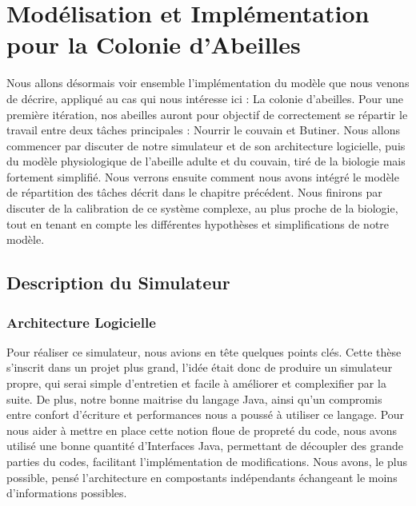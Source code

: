 \chapter{Modélisation et Implémentation pour la Colonie d'Abeilles}

	Nous allons désormais voir ensemble l'implémentation du modèle que nous venons de décrire, appliqué au cas qui nous intéresse ici : La colonie d'abeilles. Pour une première itération, nos abeilles auront pour objectif de correctement se répartir le travail entre deux tâches principales : Nourrir le couvain et Butiner. Nous allons commencer par discuter de notre simulateur et de son architecture logicielle, puis du modèle physiologique de l'abeille adulte et du couvain, tiré de la biologie mais fortement simplifié. Nous verrons ensuite comment nous avons intégré le modèle de répartition des tâches décrit dans le chapitre précédent. Nous finirons par discuter de la calibration de ce système complexe, au plus proche de la biologie, tout en tenant en compte les différentes hypothèses et simplifications de notre modèle.
	
	\section{Description du Simulateur}
		\subsection{Architecture Logicielle}
			Pour réaliser ce simulateur, nous avions en tête quelques points clés. Cette thèse s'inscrit dans un projet plus grand, l'idée était donc de produire un simulateur propre, qui serai simple d'entretien et facile à améliorer et complexifier par la suite. De plus, notre bonne maitrise du langage Java, ainsi qu'un compromis entre confort d'écriture et performances nous a poussé à utiliser ce langage. Pour nous aider à mettre en place cette notion floue de propreté du code, nous avons utilisé une bonne quantité d'Interfaces Java, permettant de découpler des grande parties du codes, facilitant l'implémentation de modifications. Nous avons, le plus possible, pensé l'architecture en compostants indépendants échangeant le moins d'informations possibles.
			
